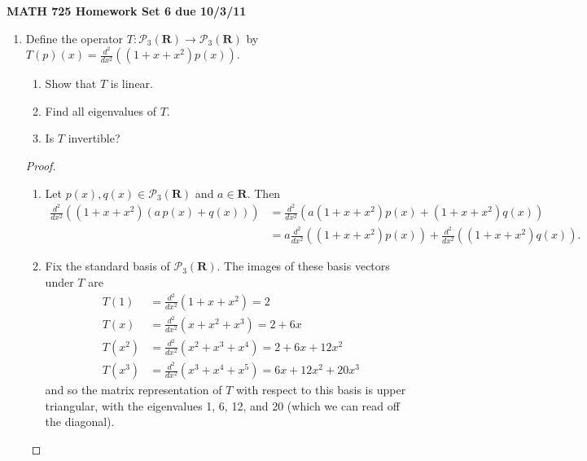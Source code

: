 \documentclass[11pt]{amsart}
\begin{document}
\setlength{\parindent}{0pt}
\setlength{\parskip}{0.4cm}
\thispagestyle{empty} 
\def\Id{\mathrm I}
\def\0{\mathbf 0}
\def\u{\mathbf u}
\def\v{\mathbf v}
\def\w{\mathbf w}
\def\C{\mathbf{C}}
\def\F{\mathbf{F}}
\def\R{\mathbf{R}}
\def\Z{\mathbf{Z}}
\def\P{\mathcal{P}}
\newcommand\spn{\operatorname{span}}
\renewcommand\null{\operatorname{null}}
\newcommand\range{\operatorname{range}}
\newcommand\rank{\operatorname{rank}}

\begin{center} {\bf MATH 725 \qquad \qquad Homework Set 6 \qquad \qquad due 10/3/11} \end{center} 

\begin{enumerate}[(1)]

\item Define the operator $T: \P_3(\R) \to \P_3(\R)$ by $T(p)(x) = \frac{ d^2 }{ dx^2 } \left( \left( 1+x+x^2 \right) p(x) \right)$.
  \begin{enumerate}
  \item Show that $T$ is linear.
  \item Find all eigenvalues of $T$.
  \item Is $T$ invertible?
  \end{enumerate}

\begin{proof}
\begin{enumerate}

\item Let $p(x), q(x) \in \P_3(\R)$ and $a \in \R$. Then
\begin{align*}
  \frac{ d^2 }{ dx^2 } \left( \left( 1+x+x^2 \right) (a \, p(x) + q(x)) \right)
  &= \frac{ d^2 }{ dx^2 } \left( a \left( 1+x+x^2 \right) p(x) + \left( 1+x+x^2 \right) q(x) \right) \\
  &= a \frac{ d^2 }{ dx^2 } \left( \left( 1+x+x^2 \right) p(x) \right) + \frac{ d^2 }{ dx^2 } \left( \left( 1+x+x^2 \right) q(x) \right) .
\end{align*}

\item Fix the standard basis of $\P_3(\R)$. The images of these basis vectors under $T$ are
\begin{align*}
  T(1) &= \frac{ d^2 }{ dx^2 } \left( 1+x+x^2 \right) = 2 \\
  T(x) &= \frac{ d^2 }{ dx^2 } \left( x+x^2 + x^3 \right) = 2 + 6x \\
  T(x^2) &= \frac{ d^2 }{ dx^2 } \left( x^2 + x^3 + x^4 \right) = 2 + 6x + 12 x^2 \\
  T(x^3) &= \frac{ d^2 }{ dx^2 } \left( x^3 + x^4 + x^5 \right) = 6x + 12 x^2 + 20 x^3
\end{align*}
and so the matrix representation of $T$ with respect to this basis is upper triangular, with the eigenvalues 1, 6, 12, and 20 (which we can read off the diagonal).


\end{enumerate}
\end{proof}
\end{enumerate}
\end{document}

